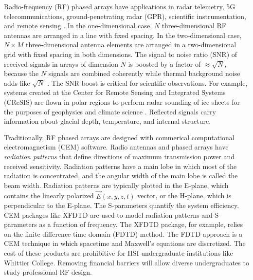 \documentclass[11pt]{amsart}
\begin{document}
Radio-frequency (RF) phased arrays have applications in radar telemetry, 5G telecommunications, ground-penetrating radar (GPR), scientific instrumentation, and remote sensing \cite{Vieregg_2016,AVVA201746,arnold_2020,PhysRevD.105.122006,10.3390/s21186091,10.1016/j.jappgeo.2022.104876,phased_array_book}.  In the one-dimensional case, $N$ three-dimensional RF antennas are arranged in a line with fixed spacing.  In the two-dimensional case, $N \times M$ three-dimensional antenna elements are arranged in a two-dimensional grid with fixed spacing in both dimensions.  The signal to noise ratio (SNR) of received signals in arrays of dimension $N$ is boosted by a factor of $\approx \sqrt{N}$, because the $N$ signals are combined coherently while thermal background noise adds like $\sqrt{N}$ \cite{AVVA201746}.  The SNR boost is critical for scientific observations.  For example, systems created at the Center for Remote Sensing and Integrated Systems (CReSIS) are flown in polar regions to perform radar sounding of ice sheets for the purposes of geophysics and climate science \cite{arnold_2020}.  Reflected signals carry information about glacial depth, temperature, and internal structure.  

Traditionally, RF phased arrays are designed with commerical computational electromagnetism (CEM) software.  Radio antennas and phased arrays have \textit{radiation patterns} that define directions of maximum transmission power and received sensitivity.  Radiation patterns have a main lobe in which most of the radiation is concentrated, and the angular width of the main lobe is called the beam width.  Radiation patterns are typically plotted in the E-plane, which contains the linearly polarized $\vec{E}(x,y,z,t)$ vector, or the H-plane, which is perpendicular to the E-plane.  The S-parameters quantify the system efficiency.  CEM packages like XFDTD are used to model radiation patterns and S-parameters as a function of frequency.  The XFDTD package, for example, relies on the finite difference time domain (FDTD) method. The FDTD approach is a CEM technique in which spacetime and Maxwell’s equations are discretized.  The cost of these products are prohibitive for HSI undergraduate institutions like Whittier College.  Removing financial barriers will allow diverse undergraduates to study professional RF design. 
\end{document}

